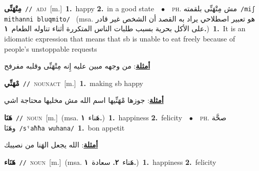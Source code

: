 \documentclass[10pt,a4paper,twoside]{article} %
\begin{document}
\begin{multicols}{2}
{\setlength\topsep{0pt}\textbf{\foreignlanguage{arabic}{مِتْهَنِّى}}\ {\color{gray}\texttt{//}\color{black}}\ \textsc{adj}\ [m.]\ \textbf{1.}~happy  \textbf{2.}~in a good state\ \ $\bullet$\ \ \textsc{ph.} \color{gray} \foreignlanguage{arabic}{مش مِتْهَنِّى بلقمته}\color{black}\ {\color{gray}\texttt{/{\sffamily miʃ mithanni bluqmito}/}\color{black}}\ \color{gray} (msa. \foreignlanguage{arabic}{هو تعبير اصطلاحي يراد به القصد أن الشخص غير قادر على الأكل بحرية بسبب طلبات الناس المتكررة أثناء تناوله الطعام}~\foreignlanguage{arabic}{\textbf{١.}})\color{black}\ \textbf{1.}~It is an idiomatic expression that means that sb is unable to eat freely because of people's unstoppable requests\  \begin{flushright}\color{gray}\foreignlanguage{arabic}{\textbf{\underline{\foreignlanguage{arabic}{أمثلة}}}: من وجهه مبين عليه إِنه مِتْهَنِّى وقلبه مفرفح}\end{flushright}\color{black}} \vspace{2mm}

{\setlength\topsep{0pt}\textbf{\foreignlanguage{arabic}{مْهَنِّي}}\ {\color{gray}\texttt{//}\color{black}}\ \textsc{noun\textunderscore act}\ [m.]\ \textbf{1.}~making sb happy\  \begin{flushright}\color{gray}\foreignlanguage{arabic}{\textbf{\underline{\foreignlanguage{arabic}{أمثلة}}}: جوزها مْهَنِّيها اسم الله مش مخليها محتاجة اشي}\end{flushright}\color{black}} \vspace{2mm}

{\setlength\topsep{0pt}\textbf{\foreignlanguage{arabic}{هَنَا}}\ {\color{gray}\texttt{//}\color{black}}\ \textsc{noun}\ [m.]\ \color{gray}(msa. \foreignlanguage{arabic}{هَناء}~\foreignlanguage{arabic}{\textbf{١.}})\color{black}\ \textbf{1.}~happiness  \textbf{2.}~felicity\ \ $\bullet$\ \ \textsc{ph.} \color{gray} \foreignlanguage{arabic}{صحَّة وهَنَا}\color{black}\ {\color{gray}\texttt{/{\sffamily sˤaħħa wuhana}/}\color{black}}\ \textbf{1.}~bon appetit\  \begin{flushright}\color{gray}\foreignlanguage{arabic}{\textbf{\underline{\foreignlanguage{arabic}{أمثلة}}}: الله يجعل الهَنا من نصيبك}\end{flushright}\color{black}} \vspace{2mm}

{\setlength\topsep{0pt}\textbf{\foreignlanguage{arabic}{هَنَاء}}\ {\color{gray}\texttt{//}\color{black}}\ \textsc{noun}\ [m.]\ \color{gray}(msa. \foreignlanguage{arabic}{هَناء}~\foreignlanguage{arabic}{\textbf{٢.}}  \foreignlanguage{arabic}{سعادة}~\foreignlanguage{arabic}{\textbf{١.}})\color{black}\ \textbf{1.}~happiness  \textbf{2.}~felicity\ } \vspace{2mm}


\end{multicols}
\end{document}
